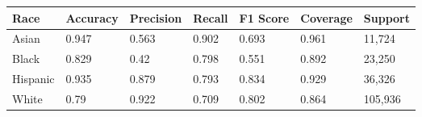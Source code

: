 \begin{tabular}{lllllll}
\toprule
Race & Accuracy & Precision & Recall & F1 Score & Coverage & Support \\
\midrule
Asian & 0.947 & 0.563 & 0.902 & 0.693 & 0.961 & 11,724 \\
Black & 0.829 & 0.42 & 0.798 & 0.551 & 0.892 & 23,250 \\
Hispanic & 0.935 & 0.879 & 0.793 & 0.834 & 0.929 & 36,326 \\
White & 0.79 & 0.922 & 0.709 & 0.802 & 0.864 & 105,936 \\
\bottomrule
\end{tabular}

